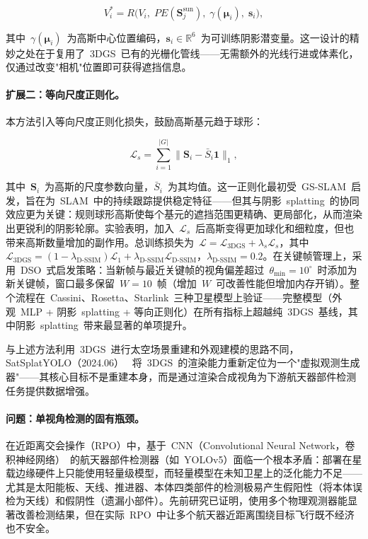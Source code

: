 \begin{equation}
    V_i^{*} = R\bigl(V_i,\; PE(\boldsymbol{S}_j^{\text{sun}}),\; \gamma(\boldsymbol{\mu}_i),\; \boldsymbol{s}_i\bigr),
\end{equation}

其中~$\gamma(\boldsymbol{\mu}_i)$~为高斯中心位置编码，$\boldsymbol{s}_i \in \mathbb{R}^6$~为可训练阴影潜变量。这一设计的精妙之处在于复用了~3DGS~已有的光栅化管线——无需额外的光线行进或体素化，仅通过改变"相机"位置即可获得遮挡信息。

\paragraph{扩展二：等向尺度正则化。}
本方法引入等向尺度正则化损失，鼓励高斯基元趋于球形：

\begin{equation}
    \mathcal{L}_s = \sum_{i=1}^{|G|} \|\boldsymbol{S}_i - \bar{S}_i \mathbf{1}\|_1,
\end{equation}

其中~$\boldsymbol{S}_i$~为高斯的尺度参数向量，$\bar{S}_i$~为其均值。这一正则化最初受~GS-SLAM~启发，旨在为~SLAM~中的持续跟踪提供稳定特征——但其与阴影~splatting~的协同效应更为关键：规则球形高斯使每个基元的遮挡范围更精确、更局部化，从而渲染出更锐利的阴影轮廓。实验表明，加入~$\mathcal{L}_s$~后高斯变得更加球化和细粒度，但也带来高斯数量增加的副作用。总训练损失为~$\mathcal{L} = \mathcal{L}_{\text{3DGS}} + \lambda_s \mathcal{L}_s$，其中~$\mathcal{L}_{\text{3DGS}} = (1 - \lambda_{\text{D-SSIM}}) \mathcal{L}_1 + \lambda_{\text{D-SSIM}} \mathcal{L}_{\text{D-SSIM}}$，$\lambda_{\text{D-SSIM}} = 0.2$。在关键帧管理上，采用~DSO~式启发策略：当新帧与最近关键帧的视角偏差超过~$\theta_{\min} = 10^{\circ}$~时添加为新关键帧，窗口最多保留~$W = 10$~帧（增加~$W$~可改善性能但增加内存开销）。整个流程在~Cassini、Rosetta、Starlink~三种卫星模型上验证——完整模型（外观~MLP + 阴影~splatting + 等向正则化）在所有指标上超越纯~3DGS~基线，其中阴影~splatting~带来最显著的单项提升。

与上述方法利用~3DGS~进行太空场景重建和外观建模的思路不同，SatSplatYOLO（2024.06）~\cite{2406_02533} 将~3DGS~的渲染能力重新定位为一个"虚拟观测生成器"——其核心目标不是重建本身，而是通过渲染合成视角为下游航天器部件检测任务提供数据增强。

\paragraph{问题：单视角检测的固有瓶颈。}
在近距离交会操作（RPO）中，基于~CNN（Convolutional Neural Network，卷积神经网络）~的航天器部件检测器（如~YOLOv5）面临一个根本矛盾：部署在星载边缘硬件上只能使用轻量级模型，而轻量模型在未知卫星上的泛化能力不足——尤其是太阳能板、天线、推进器、本体四类部件的检测极易产生假阳性（将本体误检为天线）和假阴性（遗漏小部件）。先前研究已证明，使用多个物理观测器能显著改善检测结果，但在实际~RPO~中让多个航天器近距离围绕目标飞行既不经济也不安全。

